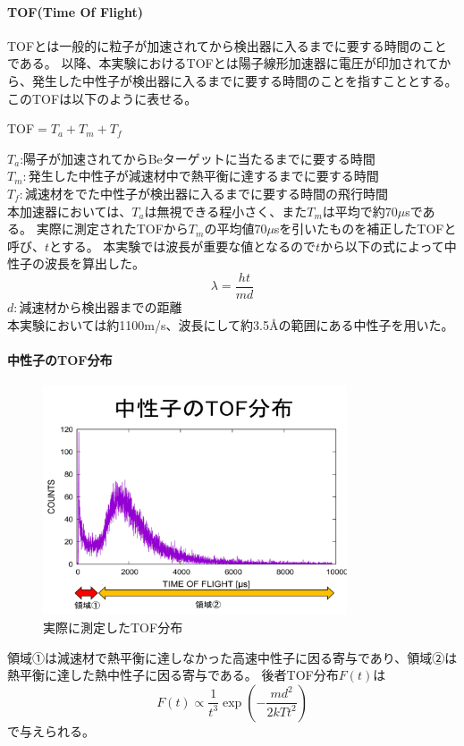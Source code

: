 \paragraph{TOF(Time Of Flight)}
TOFとは一般的に粒子が加速されてから検出器に入るまでに要する時間のことである。
以降、本実験におけるTOFとは陽子線形加速器に電圧が印加されてから、発生した中性子が検出器に入るまでに要する時間のことを指すこととする。
このTOFは以下のように表せる。
\begin{center}TOF$=T_a+T_m+T_f$\end{center}
$T_a$:陽子が加速されてからBeターゲットに当たるまでに要する時間\\
$T_m:発生した中性子が減速材中で熱平衡に達するまでに要する時間$\\
$T_f:減速材をでた中性子が検出器に入るまでに要する時間の飛行時間$\\
本加速器においては、$T_a$は無視できる程小さく、また$T_m$は平均で約70$\mu$sである。
実際に測定されたTOFから$T_m$の平均値70$\mu$sを引いたものを補正したTOFと呼び、$t$とする。
本実験では波長が重要な値となるので$t$から以下の式によって中性子の波長を算出した。
\begin{equation}
{\lambda}={\frac{ht}{md}}
\end{equation}
$d:減速材から検出器までの距離$\\
本実験においては約1100m/s、波長にして約3.5Åの範囲にある中性子を用いた。
\paragraph {中性子のTOF分布}
\begin{figure}[H]
\centering
\includegraphics[width=9cm]{accelerator/TOF1.pdf}
\caption{実際に測定したTOF分布}
\end{figure}
領域①は減速材で熱平衡に達しなかった高速中性子に因る寄与であり、領域②は熱平衡に達した熱中性子に因る寄与である。
後者TOF分布$F(t)$は\begin{equation}F(t)\propto \frac{1}{t^{3}}\exp\left(-\frac{md^2}{2kTt^2}\right) \end{equation}で与えられる。
